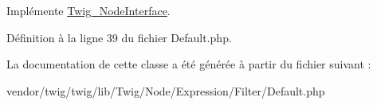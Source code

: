 Implémente \hyperlink{interface_twig___node_interface_a4e0faa87c3fae583620b84d3607085da}{Twig\+\_\+\+Node\+Interface}.



Définition à la ligne 39 du fichier Default.\+php.



La documentation de cette classe a été générée à partir du fichier suivant \+:\begin{DoxyCompactItemize}
\item 
vendor/twig/twig/lib/\+Twig/\+Node/\+Expression/\+Filter/Default.\+php\end{DoxyCompactItemize}
